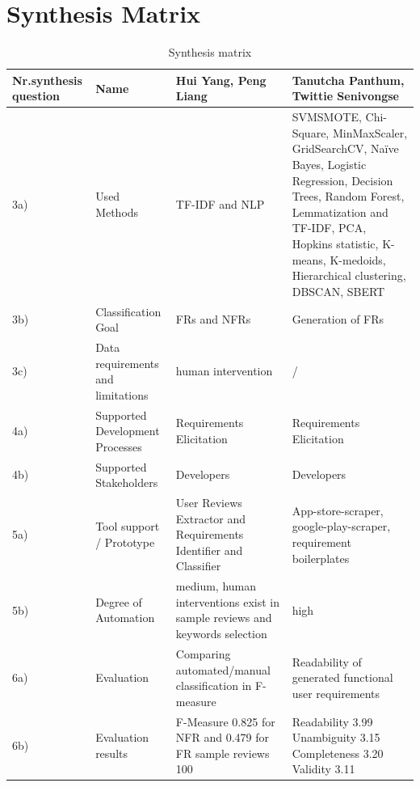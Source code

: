 \section{Synthesis Matrix}
\begin{table} [H] 
\centering
\begin{small}
\caption{Synthesis matrix }
\label{tab:table}
\setlength{\tabcolsep}{1em}
\begin{tabular}{ p{2cm}| p{3cm} | p{3cm} | p{3cm} }
\hline
 \textbf{Nr.synthesis question}&\textbf{ Name}&\textbf{Hui Yang, Peng Liang}&\textbf{Tanutcha Panthum, Twittie Senivongse}\\
\hline
 \hline	
  3a) & Used Methods & TF-IDF and NLP & SVMSMOTE, Chi-Square, MinMaxScaler, GridSearchCV, Naïve Bayes, Logistic Regression, Decision Trees, Random Forest, Lemmatization and TF-IDF, PCA, Hopkins statistic, K-means, K-medoids, Hierarchical clustering, DBSCAN, SBERT \\
 \hline
  3b)& Classification Goal & FRs and NFRs & Generation of FRs  \\
 \hline
  3c) & Data requirements and limitations & human intervention & / \\
  \hline	
  4a) & Supported Development Processes & Requirements Elicitation & Requirements Elicitation\\
 \hline
  4b) & Supported Stakeholders & Developers & Developers  \\
 \hline
  5a) & Tool support / Prototype & User Reviews Extractor and Requirements Identifier and Classifier & App-store-scraper, google-play-scraper, requirement boilerplates\\
  \hline	
  5b) & Degree of Automation & medium, human interventions exist in sample reviews and keywords selection & high\\
 \hline
  6a) & Evaluation & Comparing automated/manual classification in F-measure & Readability of generated functional user requirements  \\
 \hline
  6b) & Evaluation results & F-Measure 0.825 for NFR and 0.479 for FR sample reviews 100 & Readability 3.99 Unambiguity 3.15 Completeness 3.20 Validity 3.11 \\
  \hline
\end{tabular}
\end{small}
\end{table}


